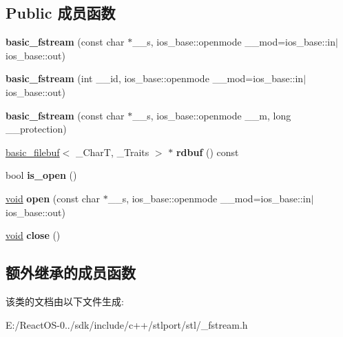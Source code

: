 \subsection*{Public 成员函数}
\begin{DoxyCompactItemize}
\item 
\mbox{\label{classbasic__fstream_a86ade6b4e9b0dfbc55a83e392df2c2de}} 
{\bfseries basic\+\_\+fstream} (const char $\ast$\+\_\+\+\_\+s, ios\+\_\+base\+::openmode \+\_\+\+\_\+mod=ios\+\_\+base\+::in$\vert$ios\+\_\+base\+::out)
\item 
\mbox{\label{classbasic__fstream_afd076548dd46556446c3510f5e10c951}} 
{\bfseries basic\+\_\+fstream} (int \+\_\+\+\_\+id, ios\+\_\+base\+::openmode \+\_\+\+\_\+mod=ios\+\_\+base\+::in$\vert$ios\+\_\+base\+::out)
\item 
\mbox{\label{classbasic__fstream_a4c3044602f84defaeba13030eb99d37b}} 
{\bfseries basic\+\_\+fstream} (const char $\ast$\+\_\+\+\_\+s, ios\+\_\+base\+::openmode \+\_\+\+\_\+m, long \+\_\+\+\_\+protection)
\item 
\mbox{\label{classbasic__fstream_a8b049cf9aa730d9086ba1a1a0e1d7aac}} 
\hyperlink{classbasic__filebuf}{basic\+\_\+filebuf}$<$ \+\_\+\+CharT, \+\_\+\+Traits $>$ $\ast$ {\bfseries rdbuf} () const
\item 
\mbox{\label{classbasic__fstream_ae56de7edd856817923f645a1f56752ca}} 
bool {\bfseries is\+\_\+open} ()
\item 
\mbox{\label{classbasic__fstream_a778ee7d473a0786344806d164eddada5}} 
\hyperlink{interfacevoid}{void} {\bfseries open} (const char $\ast$\+\_\+\+\_\+s, ios\+\_\+base\+::openmode \+\_\+\+\_\+mod=ios\+\_\+base\+::in$\vert$ios\+\_\+base\+::out)
\item 
\mbox{\label{classbasic__fstream_adb03beb9e69af8d2c898915aa7ce6e24}} 
\hyperlink{interfacevoid}{void} {\bfseries close} ()
\end{DoxyCompactItemize}
\subsection*{额外继承的成员函数}


该类的文档由以下文件生成\+:\begin{DoxyCompactItemize}
\item 
E\+:/\+React\+O\+S-\/0../sdk/include/c++/stlport/stl/\+\_\+fstream.\+h\end{DoxyCompactItemize}
